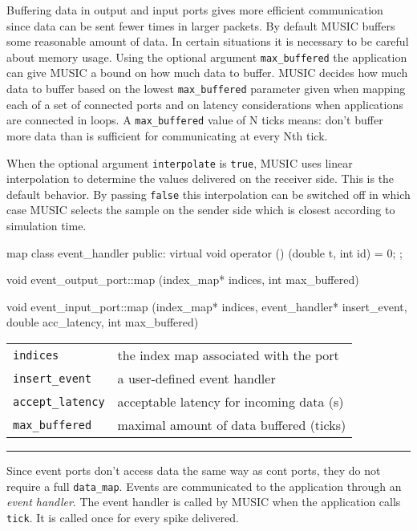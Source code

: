 \documentclass[a4paper]{report}
\makeatletter
\newenvironment{parameters}%
{\begin{tabular}{@{\hspace{2em}}lp{0.6\textwidth}}}%
{\end{tabular}\par\vspace{1mm}\par\hrule\par\vspace{5mm}}
\makeatother
\begin{document}
Buffering data in output and input ports gives more efficient
communication since data can be sent fewer times in larger packets.
By default MUSIC buffers some reasonable amount of data.  In certain
situations it is necessary to be careful about memory usage.  Using
the optional argument \lstinline|max_buffered| the application can
give MUSIC a bound on how much data to buffer.  MUSIC decides how much
data to buffer based on the lowest \lstinline|max_buffered| parameter
given when mapping each of a set of connected ports and on latency
considerations when applications are connected in loops.  A
\lstinline|max_buffered| value of N ticks means: don't buffer more
data than is sufficient for communicating at every Nth tick.

When the optional argument \lstinline|interpolate| is
\lstinline|true|, MUSIC uses linear interpolation to determine the
values delivered on the receiver side.  This is the default behavior.
By passing \lstinline|false| this interpolation can be switched off in
which case MUSIC selects the sample on the sender side which is
closest according to simulation time.

\begin{head}{map}
  class event_handler {
  public:
    virtual void operator () (double t, int id) = 0;
  };
  
  void event_output_port::map (index_map* indices,
                               int max_buffered)

  void event_input_port::map (index_map* indices,
                              event_handler* insert_event,
                              double acc_latency,
                              int max_buffered)
\end{head}
\begin{parameters}
  \lstinline|indices| & the index map associated with the port \\
  \lstinline|insert_event| & a user-defined event handler \\
  \lstinline|accept_latency| & acceptable latency for incoming data (s) \\
  \lstinline|max_buffered| & maximal amount of data buffered (ticks) \\
\end{parameters}

Since event ports don't access data the same way as cont ports, they
do not require a full \lstinline|data_map|.  Events are communicated
to the application through an \emph{event handler}.  The event handler is called by MUSIC when the application
calls \lstinline|tick|.  It is called once for every spike delivered.
\end{document}
